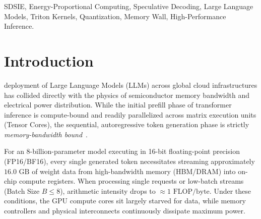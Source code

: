 \documentclass[10pt,journal,compsoc,twocolumn]{IEEEtran}
\begin{document}
{\begin{abstract}
decoding with no adaptive gating -- is maintained in a focused companion repository (\url{https://github.com/Creepybits/sdsie-fixed-k5-speculative-decoding}) and is the result we recommend for any near-term deployment or evaluation.
\end{abstract}

\begin{IEEEkeywords}
SDSIE, Energy-Proportional Computing, Speculative Decoding, Large Language Models, Triton Kernels, Quantization, Memory Wall, High-Performance Inference.
\end{IEEEkeywords}}

\maketitle
\IEEEdisplaynontitleabstractindextext
\IEEEpeerreviewmaketitle

\section{Introduction}
 deployment of Large Language Models (LLMs) across global cloud infrastructures has collided directly with the physics of semiconductor memory bandwidth and electrical power distribution. While the initial prefill phase of transformer inference is compute-bound and readily parallelized across matrix execution units (Tensor Cores), the sequential, autoregressive token generation phase is strictly \textit{memory-bandwidth bound}~\cite{dao2022flashattention, kim2023memorywall}. 

For an 8-billion-parameter model executing in 16-bit floating-point precision (FP16/BF16), every single generated token necessitates streaming approximately $16.0\text{ GB}$ of weight data from high-bandwidth memory (HBM/DRAM) into on-chip compute registers. When processing single requests or low-batch streams (Batch Size $B \le 8$), arithmetic intensity drops to $\approx 1\text{ FLOP/byte}$. Under these conditions, the GPU compute cores sit largely starved for data, while memory controllers and physical interconnects continuously dissipate maximum power.
\end{document}

